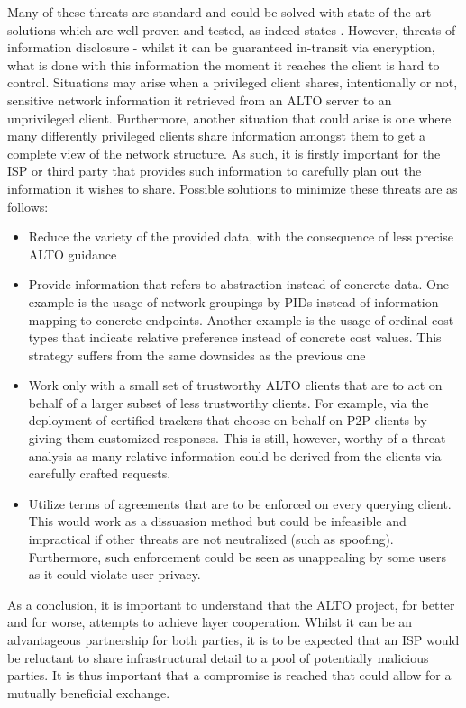 \documentclass[
  oneside,
  11pt, a4paper,
  footinclude=true,
  headinclude=true,
  cleardoublepage=empty
]{scrbook}
\begin{document}
    Many of these threats are standard and could be solved with state of the art solutions which are well proven and tested, as indeed states \cite{alto-protocol}. However, threats of information disclosure - whilst it can be guaranteed in-transit via encryption, what is done with this information the moment it reaches the client is hard to control. Situations may arise when a privileged client shares, intentionally or not, sensitive network information it retrieved from an ALTO server to an unprivileged client. Furthermore, another situation that could arise is one where many differently privileged clients share information amongst them to get a complete view of the network structure. As such, it is firstly important for the ISP or third party that provides such information to carefully plan out the information it wishes to share. Possible solutions to minimize these threats are as follows:
    
    \begin{itemize}
        \item Reduce the variety of the provided data, with the consequence of less precise ALTO guidance
        \item Provide information that refers to abstraction instead of concrete data. One example is the usage of network groupings by PIDs instead of information mapping to concrete endpoints. Another example is the usage of ordinal cost types that indicate relative preference instead of concrete cost values. This strategy suffers from the same downsides as the previous one
        \item Work only with a small set of trustworthy ALTO clients that are to act on behalf of a larger subset of less trustworthy clients. For example, via the deployment of certified trackers that choose on behalf on P2P clients by giving them customized responses. This is still, however, worthy of a threat analysis as many relative information could be derived from the clients via carefully crafted requests.
        \item Utilize terms of agreements that are to be enforced on every querying client. This would work as a dissuasion method but could be infeasible and impractical if other threats are not neutralized (such as spoofing). Furthermore, such enforcement could be seen as unappealing by some users as it could violate user privacy.
    \end{itemize}
    
    As a conclusion, it is important to understand that the ALTO project, for better and for worse, attempts to achieve layer cooperation. Whilst it can be an advantageous partnership for both parties, it is to be expected that an ISP would be reluctant to share infrastructural detail to a pool of potentially malicious parties. It is thus important that a compromise is reached that could allow for a mutually beneficial exchange. 
    
\end{document}

